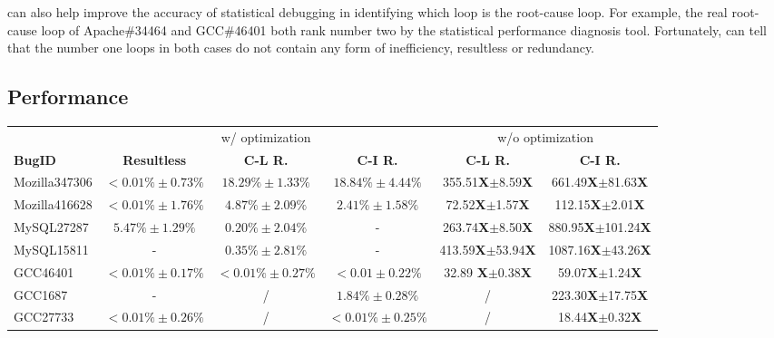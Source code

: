 \Tool can also help improve the accuracy of statistical debugging in
identifying which loop is the root-cause loop.
For example, the real root-cause loop of Apache\#34464 and GCC\#46401 both
rank number two by the statistical performance diagnosis tool.
Fortunately,
\Tool can tell that the number one loops in both cases do not contain
any form of inefficiency, resultless or redundancy. 

\subsection{Performance}
\label{sec:result_perf}

\begin{table}
  \centering
  \tiny
  \newcommand{\Yes}[1]{\checkmark{}$_#1$}
  \newcommand{\No}[0]{-}
  \begin{tabular}{lccccc}
    \toprule
	    & \multicolumn{3}{c}{\Tool w/ optimization} & \multicolumn{2}{c}{w/o optimization} \\
     \cmidrule(lr){2-4}
     \cmidrule(lr){5-6}
     {\bf BugID}  & {\bf Resultless}  &  {\bf C-L R. } & {\bf C-I R. }  & {\bf C-L R.}  & {\bf C-I R. } \\
    \midrule
    Mozilla347306 &  $<0.01\%\pm0.73\%$  & $18.29\%\pm1.33\%$       &  $18.84\%\pm4.44\%$  & 355.51{\bf X}$\pm$8.59{\bf X} & 661.49{\bf X}$\pm$81.63{\bf X} \\ 
    Mozilla416628 &  $<0.01\%\pm1.76\%$  & $4.87\%\pm2.09\%$        &  $2.41\%\pm1.58\%$   & 72.52{\bf X}$\pm$1.57{\bf X}  & 112.15{\bf X}$\pm$2.01{\bf X} \\
    \midrule
     MySQL27287   &  $5.47\%\pm1.29\%$   & $0.20\%\pm2.04\%$        &   -                  & 263.74{\bf X}$\pm$8.50{\bf X} & 880.95{\bf X}$\pm$101.24{\bf X} \\
     MySQL15811   &  -                   & $0.35\%\pm2.81\%$        &   -                  & 413.59{\bf X}$\pm$53.94{\bf X}& 1087.16{\bf X}$\pm$43.26{\bf X} \\
    \midrule
      GCC46401    &  $<0.01\%\pm0.17\%$  & $<0.01\%\pm0.27\%$       &  $<0.01\pm0.22\%$    & 32.89 {\bf X}$\pm$0.38{\bf X} & 59.07{\bf X}$\pm$1.24{\bf X}\\ 
      GCC1687     & -              & /                 &  $1.84\%\pm0.28\%$                &   /                           & 223.30{\bf X}$\pm$17.75{\bf X} \\
      GCC27733    & $<0.01\%\pm0.26\%$   & /           &  $<0.01\%\pm0.25\%$               &   /                           & 18.44{\bf X}$\pm$0.32{\bf X}     \\

\end{tabular}
\end{table}
